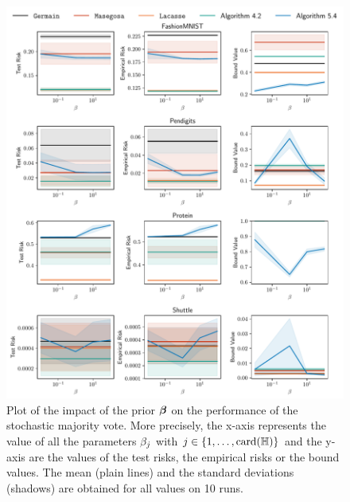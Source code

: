 \begin{noaddcontents}
\begin{figure}
    \centering
    \includegraphics[width=\textwidth]{chapter_5/figures/prior_3.pdf}
    \caption{
    Plot of the impact of the prior $\boldsymbol{\beta}$ on the performance of the stochastic majority vote.
    More precisely, the x-axis represents the value of all the parameters $\beta_j$ with $j\in\{1,\dots,\operatorname{card}(\mathbb{H})\}$ and the y-axis are the values of the test risks, the empirical risks or the bound values.
    The mean (plain lines) and the standard deviations (shadows) are obtained for all values on 10 runs.
    }
    \label{ap:mv-sto:fig:prior-3}
\end{figure}


\end{noaddcontents}
